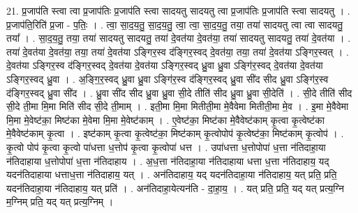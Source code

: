\documentclass[17pt]{extarticle}
\begin{document}
21. प्र॒जाप॑ति स्त्वा त्वा प्र॒जाप॑तिः प्र॒जाप॑ति स्त्वा सादयतु सादयतु त्वा प्र॒जाप॑तिः प्र॒जाप॑ति स्त्वा सादयतु । . प्र॒जाप॑ति॒रिति॑ प्र॒जा - प॒तिः॒ । . त्वा॒ सा॒द॒य॒तु॒ सा॒द॒य॒तु॒ त्वा॒ त्वा॒ सा॒द॒य॒तु॒ तया॒ तया॑ सादयतु त्वा त्वा सादयतु॒ तया᳚ । . सा॒द॒य॒तु॒ तया॒ तया॑ सादयतु सादयतु॒ तया॑ दे॒वत॑या दे॒वत॑या॒ तया॑ सादयतु सादयतु॒ तया॑ दे॒वत॑या । . तया॑ दे॒वत॑या दे॒वत॑या॒ तया॒ तया॑ दे॒वत॑या ऽङ्गिर॒स्व द॑ङ्गिर॒स्वद् दे॒वत॑या॒ तया॒ तया॑ दे॒वत॑या ऽङ्गिर॒स्वत् । . दे॒वत॑या ऽङ्गिर॒स्व द॑ङ्गिर॒स्वद् दे॒वत॑या दे॒वत॑या ऽङ्गिर॒स्वद् ध्रु॒वा ध्रु॒वा ऽङ्गि॑र॒स्वद् दे॒वत॑या दे॒वत॑या ऽङ्गिर॒स्वद् ध्रु॒वा । . अ॒ङ्गि॒र॒स्वद् ध्रु॒वा ध्रु॒वा ऽङ्गि॑र॒स्व द॑ङ्गिर॒स्वद् ध्रु॒वा सी॑द सीद ध्रु॒वा ऽङ्गि॑र॒स्व द॑ङ्गिर॒स्वद् ध्रु॒वा सी॑द । . ध्रु॒वा सी॑द सीद ध्रु॒वा ध्रु॒वा सी॒दे तीति॑ सीद ध्रु॒वा ध्रु॒वा सी॒देति॑ । . सी॒दे तीति॑ सीद सी॒दे ती॒मा मि॒मा मिति॑ सीद सी॒दे ती॒माम् । . इती॒मा मि॒मा मितीती॒मा मे॒वैवेमा मितीती॒मा मे॒व । . इ॒मा मे॒वैवेमा मि॒मा मे॒वेष्ट॑का॒ मिष्ट॑का मे॒वेमा मि॒मा मे॒वेष्ट॑काम् । . ए॒वेष्ट॑का॒ मिष्ट॑का मे॒वैवेष्ट॑काम् कृ॒त्वा कृ॒त्वेष्ट॑का मे॒वैवेष्ट॑काम् कृ॒त्वा । . इष्ट॑काम् कृ॒त्वा कृ॒त्वेष्ट॑का॒ मिष्ट॑काम् कृ॒त्वोपोप॑ कृ॒त्वेष्ट॑का॒ मिष्ट॑काम् कृ॒त्वोप॑ । . कृ॒त्वो पोप॑ कृ॒त्वा कृ॒त्वो पा॑धत्ता ध॒त्तोप॑ कृ॒त्वा कृ॒त्वोपा॑ धत्त । . उपा॑धत्ता ध॒त्तोपोपा॑ ध॒त्ता न॑तिदाहा॒या न॑तिदाहाया ध॒त्तोपोपा॑ ध॒त्ता न॑तिदाहाय । . अ॒ध॒त्ता न॑तिदाहा॒या न॑तिदाहाया धत्ता ध॒त्ता न॑तिदाहाय॒ यद् यदन॑तिदाहाया धत्ताध॒त्ता न॑तिदाहाय॒ यत् । . अन॑तिदाहाय॒ यद् यदन॑तिदाहा॒या न॑तिदाहाय॒ यत् प्रति॒ प्रति॒ यदन॑तिदाहा॒या न॑तिदाहाय॒ यत् प्रति॑ । . अन॑तिदाहा॒येत्यन॑ति - दा॒हा॒य॒ । . यत् प्रति॒ प्रति॒ यद् यत् प्रत्य॒ग्नि म॒ग्निम् प्रति॒ यद् यत् प्रत्य॒ग्निम् । \newline
\end{document}
